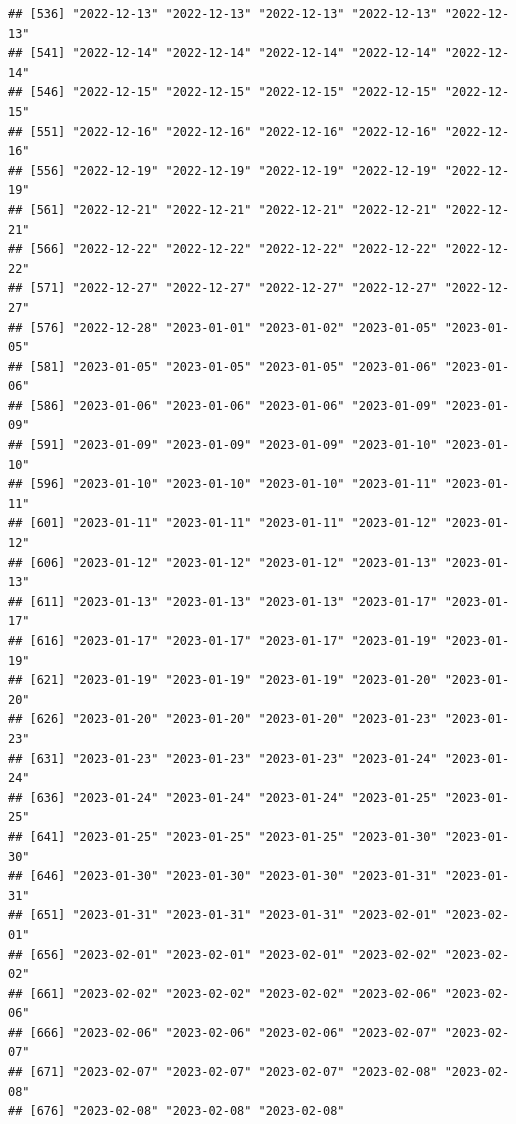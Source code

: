 \documentclass[
]{article}
\begin{document}
\begin{verbatim}
## [536] "2022-12-13" "2022-12-13" "2022-12-13" "2022-12-13" "2022-12-13"
## [541] "2022-12-14" "2022-12-14" "2022-12-14" "2022-12-14" "2022-12-14"
## [546] "2022-12-15" "2022-12-15" "2022-12-15" "2022-12-15" "2022-12-15"
## [551] "2022-12-16" "2022-12-16" "2022-12-16" "2022-12-16" "2022-12-16"
## [556] "2022-12-19" "2022-12-19" "2022-12-19" "2022-12-19" "2022-12-19"
## [561] "2022-12-21" "2022-12-21" "2022-12-21" "2022-12-21" "2022-12-21"
## [566] "2022-12-22" "2022-12-22" "2022-12-22" "2022-12-22" "2022-12-22"
## [571] "2022-12-27" "2022-12-27" "2022-12-27" "2022-12-27" "2022-12-27"
## [576] "2022-12-28" "2023-01-01" "2023-01-02" "2023-01-05" "2023-01-05"
## [581] "2023-01-05" "2023-01-05" "2023-01-05" "2023-01-06" "2023-01-06"
## [586] "2023-01-06" "2023-01-06" "2023-01-06" "2023-01-09" "2023-01-09"
## [591] "2023-01-09" "2023-01-09" "2023-01-09" "2023-01-10" "2023-01-10"
## [596] "2023-01-10" "2023-01-10" "2023-01-10" "2023-01-11" "2023-01-11"
## [601] "2023-01-11" "2023-01-11" "2023-01-11" "2023-01-12" "2023-01-12"
## [606] "2023-01-12" "2023-01-12" "2023-01-12" "2023-01-13" "2023-01-13"
## [611] "2023-01-13" "2023-01-13" "2023-01-13" "2023-01-17" "2023-01-17"
## [616] "2023-01-17" "2023-01-17" "2023-01-17" "2023-01-19" "2023-01-19"
## [621] "2023-01-19" "2023-01-19" "2023-01-19" "2023-01-20" "2023-01-20"
## [626] "2023-01-20" "2023-01-20" "2023-01-20" "2023-01-23" "2023-01-23"
## [631] "2023-01-23" "2023-01-23" "2023-01-23" "2023-01-24" "2023-01-24"
## [636] "2023-01-24" "2023-01-24" "2023-01-24" "2023-01-25" "2023-01-25"
## [641] "2023-01-25" "2023-01-25" "2023-01-25" "2023-01-30" "2023-01-30"
## [646] "2023-01-30" "2023-01-30" "2023-01-30" "2023-01-31" "2023-01-31"
## [651] "2023-01-31" "2023-01-31" "2023-01-31" "2023-02-01" "2023-02-01"
## [656] "2023-02-01" "2023-02-01" "2023-02-01" "2023-02-02" "2023-02-02"
## [661] "2023-02-02" "2023-02-02" "2023-02-02" "2023-02-06" "2023-02-06"
## [666] "2023-02-06" "2023-02-06" "2023-02-06" "2023-02-07" "2023-02-07"
## [671] "2023-02-07" "2023-02-07" "2023-02-07" "2023-02-08" "2023-02-08"
## [676] "2023-02-08" "2023-02-08" "2023-02-08"
\end{verbatim}
\end{document}
